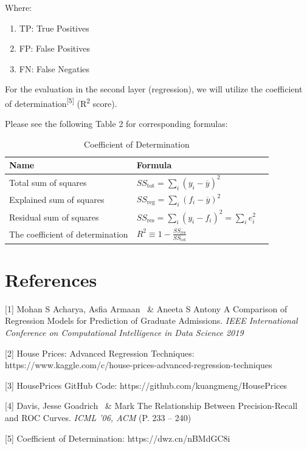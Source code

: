 \documentclass{article}
\begin{document}
Where:
	\begin{enumerate}[-]
	\item TP: True Positives
	\item FP: False Positives
	\item FN: False Negaties
	\end{enumerate}

For the evaluation in the second layer (regression), we will utilize the coefficient of determination\textsuperscript{[5]} (R\textsuperscript{2} score).

Please see the following Table 2 for corresponding formulas:
\begin{table}[H]
  \caption{Coefficient of Determination}
  \label{Coefficient of Determination}
  \centering
  \begin{tabular}{lll}
    \toprule
    \cmidrule(r){1-2}
    Name     & Formula\\
    \midrule
    Total sum of squares & $SS_{ \mathrm{tot}}=\sum_{i}\left(y_{i}-\overline{y}\right)^{2}$     \\
    Explained sum of squares     & $S S _ { \mathrm { reg } } = \sum _ { i } \left( f _ { i } - \overline { y } \right) ^ { 2 }$ \\
    Residual sum of squares     & $S S _ { \mathrm { res } } = \sum _ { i } \left( y _ { i } - f _ { i } \right) ^ { 2 } = \sum _ { i } e _ { i } ^ { 2 }$\\
     \midrule
    The coefficient of determination & $R ^ { 2 } \equiv 1 - \frac { S S _ { \mathrm { res } } } { S S _ { \mathrm { tot } } }$ \\
    \bottomrule
  \end{tabular}
\end{table}

\section*{References}
\small
[1] Mohan S Acharya, Asfia Armaan \ \& Aneeta S Antony 
A Comparison of Regression Models for Prediction of Graduate Admissions. {\it IEEE International Conference on Computational Intelligence in Data Science 2019}

[2] House Prices: Advanced Regression Techniques: https://www.kaggle.com/c/house-prices-advanced-regression-techniques

[3] HousePrices GitHub Code: https://github.com/kuangmeng/HousePrices

[4] Davis, Jesse Goadrich \ \& Mark 
The Relationship Between Precision-Recall and ROC Curves. {\it ICML '06, ACM} (P. 233 -- 240)

[5] Coefficient of Determination: https://dwz.cn/nBMdGC8i
\end{document}
